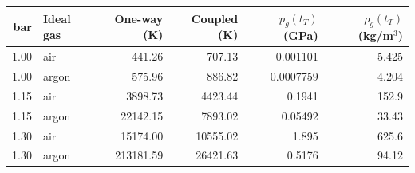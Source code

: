 \begin{tabular}{rlrrrr}
\toprule
bar & Ideal gas & One-way (K) & Coupled (K) & $p_g(t_T)$ (GPa) & $\rho_g(t_T)$ (kg/m$^3$) \\
\midrule
1.00 & air & 441.26 & 707.13 & 0.001101 & 5.425 \\
1.00 & argon & 575.96 & 886.82 & 0.0007759 & 4.204 \\
1.15 & air & 3898.73 & 4423.44 & 0.1941 & 152.9 \\
1.15 & argon & 22142.15 & 7893.02 & 0.05492 & 33.43 \\
1.30 & air & 15174.00 & 10555.02 & 1.895 & 625.6 \\
1.30 & argon & 213181.59 & 26421.63 & 0.5176 & 94.12 \\
\bottomrule
\end{tabular}
